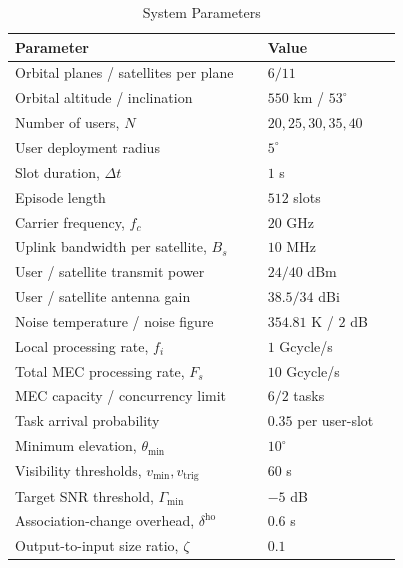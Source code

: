 \documentclass[journal]{IEEEtran}
\makeatletter
\newcommand{\LEOTableSetup}{%
  \setlength{\parskip}{0pt}%
  \setlength{\belowcaptionskip}{5pt}%
  \def\@IEEEtablecaptionsepspace{\vskip5pt\relax}%
}
\makeatother
\begin{document}
\begin{table}[t]
\centering
\noindent
\begin{minipage}[t]{0.485\textwidth}
\vspace{0pt}
\LEOTableSetup
\caption{System Parameters}
    \label{tab:simulation_parameters}
    \centering
    \footnotesize
    \renewcommand{\arraystretch}{1.08}
    \setlength{\tabcolsep}{4pt}
    \begin{tabular}{p{0.60\linewidth}p{0.32\linewidth}}
        \hline
        Parameter & Value \\
        \hline
        Orbital planes / satellites per plane & $6/11$ \\
        Orbital altitude / inclination & $550$ km / $53^\circ$ \\
        Number of users, $N$ & $20,25,30,35,40$ \\
        User deployment radius & $5^\circ$ \\
        Slot duration, $\Delta t$ & $1$ s \\
        Episode length & $512$ slots \\
        Carrier frequency, $f_c$ & $20$ GHz \\
        Uplink bandwidth per satellite, $B_s$ & $10$ MHz \\
        User / satellite transmit power & $24/40$ dBm \\
        User / satellite antenna gain & $38.5/34$ dBi \\
        Noise temperature / noise figure & $354.81$ K / $2$ dB \\
        Local processing rate, $f_i$ & $1$ Gcycle/s \\
        Total MEC processing rate, $F_s$ & $10$ Gcycle/s \\
        MEC capacity / concurrency limit & $6/2$ tasks \\
        Task arrival probability & $0.35$ per user-slot \\
        Minimum elevation, $\theta_{\min}$ & $10^\circ$ \\
        Visibility thresholds, $v_{\min},v_{\mathrm{trig}}$
        & $60$ s \\
        Target SNR threshold, $\Gamma_{\min}$ & $-5$ dB \\
        Association-change overhead, $\delta^{\mathrm{ho}}$
        & $0.6$ s \\
        Output-to-input size ratio, $\zeta$ & $0.1$ \\

\end{tabular}
\end{minipage}
\end{table}
\end{document}
